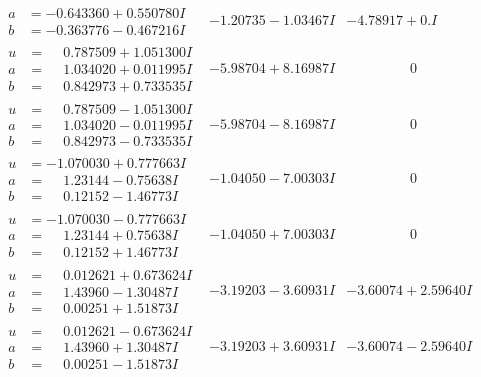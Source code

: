 \documentclass[1p]{elsarticle_modified}
\theoremstyle{definition}
\begin{document}
$$\begin{array}{c|c|c}
\begin{aligned}
a &= -0.643360 + 0.550780 I \\
b &= -0.363776 - 0.467216 I\end{aligned}
 & -1.20735 - 1.03467 I & -4.78917 + 0. I\phantom{ +0.000000I} \\ \hline\begin{aligned}
u &= \phantom{-}0.787509 + 1.051300 I \\
a &= \phantom{-}1.034020 + 0.011995 I \\
b &= \phantom{-}0.842973 + 0.733535 I\end{aligned}
 & -5.98704 + 8.16987 I & \phantom{-0.000000 } 0 \\ \hline\begin{aligned}
u &= \phantom{-}0.787509 - 1.051300 I \\
a &= \phantom{-}1.034020 - 0.011995 I \\
b &= \phantom{-}0.842973 - 0.733535 I\end{aligned}
 & -5.98704 - 8.16987 I & \phantom{-0.000000 } 0 \\ \hline\begin{aligned}
u &= -1.070030 + 0.777663 I \\
a &= \phantom{-}1.23144 - 0.75638 I \\
b &= \phantom{-}0.12152 - 1.46773 I\end{aligned}
 & -1.04050 - 7.00303 I & \phantom{-0.000000 } 0 \\ \hline\begin{aligned}
u &= -1.070030 - 0.777663 I \\
a &= \phantom{-}1.23144 + 0.75638 I \\
b &= \phantom{-}0.12152 + 1.46773 I\end{aligned}
 & -1.04050 + 7.00303 I & \phantom{-0.000000 } 0 \\ \hline\begin{aligned}
u &= \phantom{-}0.012621 + 0.673624 I \\
a &= \phantom{-}1.43960 - 1.30487 I \\
b &= \phantom{-}0.00251 + 1.51873 I\end{aligned}
 & -3.19203 - 3.60931 I & -3.60074 + 2.59640 I \\ \hline\begin{aligned}
u &= \phantom{-}0.012621 - 0.673624 I \\
a &= \phantom{-}1.43960 + 1.30487 I \\
b &= \phantom{-}0.00251 - 1.51873 I\end{aligned}
 & -3.19203 + 3.60931 I & -3.60074 - 2.59640 I\\

\end{array}$$
\end{document}
